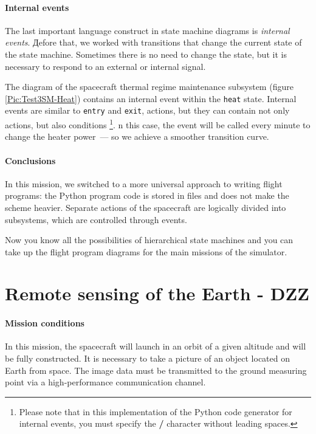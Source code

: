 \documentclass[12pt,a4paper]{article}
\begin{document}
\paragraph{Internal events}

The last important language construct in state machine diagrams is \emph{internal events}. Дefore that, we worked with transitions that change the current state of the state machine. Sometimes there is no need to change the state, but it is necessary to respond to an external or internal signal.

The diagram of the spacecraft thermal regime maintenance subsystem (figure \ref{Pic:Test3SM-Heat})
contains an internal event within the \verb'heat' state. Internal events are similar to \verb'entry' and \verb'exit', actions, but they can contain not only actions, but also
conditions \footnote{Please note that in this implementation of the Python code generator for internal events, you must specify the \textbf{/} character without leading spaces.}. n this case, the event will be called every minute to change the heater power~--- so we achieve a smoother transition curve.

\paragraph{Conclusions}

In this mission, we switched to a more universal approach to writing flight programs: the Python program code is stored in files and does not make the scheme heavier. Separate actions of the spacecraft are logically divided into subsystems, which are controlled through events.

Now you know all the possibilities of hierarchical state machines and you can take up the flight program diagrams for the main missions of the simulator.

\section{Remote sensing of the Earth - DZZ}

\paragraph{Mission conditions} In this mission, the spacecraft will launch in an orbit of a given altitude and will be fully constructed. It is necessary to take a picture of an object located on Earth from space. The image data must be transmitted to the ground measuring point via a high-performance communication channel.
\end{document}
